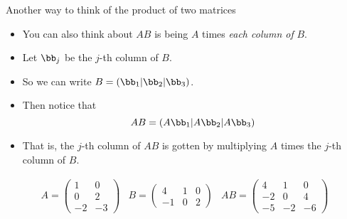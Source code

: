 \documentclass{beamer}
\begin{document}
\begin{frame}{Another way to think of the product of two matrices}

\begin{itemize}
\item You can also think about $A B$ is being $A$ times \emph{each column of} $B$.
\item Let $\bb_j$ be the $j$-th column of $B$.
\item So we can write $B = (\bb_1 \vert \bb_2 \vert \bb_3)$.

\item Then notice that
$$A B = (A\bb_1 \vert A\bb_2 \vert A\bb_3)$$

\item That is, the $j$-th column of $A B$ is gotten by multiplying $A$ times the $j$-th column of $B$.
\end{itemize}

$$
\begin{matrix}
A =

\begin{pmatrix}
1 & 0 \\
0 & 2 \\
-2 & -3
\end{pmatrix}

&

B =

\begin{pmatrix}
4  & 1 & 0 \\
-1 & 0 & 2
\end{pmatrix}

&

A B =

\begin{pmatrix}
4 & 1 & 0 \\
-2 & 0 & 4 \\
-5 & -2 & -6
\end{pmatrix}

\end{matrix}
$$

\end{frame}

\end{document}
